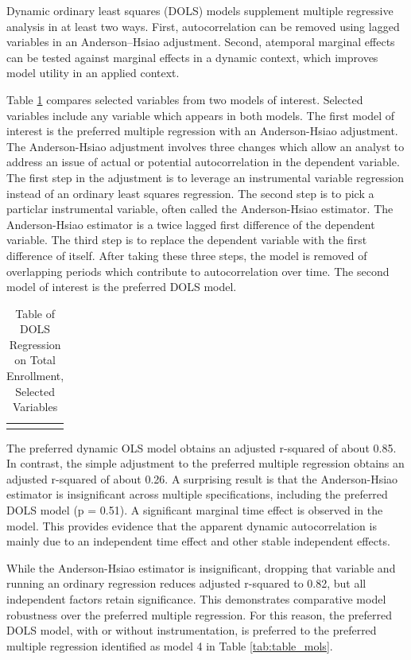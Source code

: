 \documentclass[review]{elsarticle}
\begin{document}
Dynamic ordinary least squares (DOLS) models supplement multiple regressive analysis in at least two ways.
First, autocorrelation can be removed using lagged variables in an Anderson–Hsiao adjustment\cite{anderson1981estimation}.
Second, atemporal marginal effects can be tested against marginal effects in a dynamic context,
which improves model utility in an applied context.

Table \ref{tab:table_dols} compares selected variables from two models of interest.
Selected variables include any variable which appears in both models.
The first model of interest is the preferred multiple regression with an Anderson-Hsiao adjustment.
The Anderson-Hsiao adjustment involves three changes which allow an analyst to address an issue of actual or potential autocorrelation in the dependent variable.
The first step in the adjustment is to leverage an instrumental variable regression instead of an ordinary least squares regression.
The second step is to pick a particlar instrumental variable, often called the Anderson-Hsiao estimator.
The Anderson-Hsiao estimator is a twice lagged first difference of the dependent variable.
The third step is to replace the dependent variable with the first difference of itself.
After taking these three steps, the model is removed of overlapping periods which contribute to autocorrelation over time.
The second model of interest is the preferred DOLS model.

\begin{table}
    \caption{Table of DOLS Regression on Total Enrollment, Selected Variables}
    \begin{tabularx}{\textwidth}{X}
        \centering
        
    \end{tabularx}
    \label{tab:table_dols}
\end{table}

The preferred dynamic OLS model obtains an adjusted r-squared of about 0.85.
In contrast, the simple adjustment to the preferred multiple regression
obtains an adjusted r-squared of about 0.26.
A surprising result is that the Anderson-Hsiao estimator is insignificant
across multiple specifications, including the preferred DOLS model (p = 0.51).
A significant marginal time effect is observed in the model.
This provides evidence that the apparent dynamic autocorrelation is
mainly due to an independent time effect and other stable independent effects.

While the Anderson-Hsiao estimator is insignificant,
dropping that variable and running an ordinary regression reduces adjusted r-squared to 0.82,
but all independent factors retain significance.
This demonstrates comparative model robustness over the preferred multiple regression.
For this reason, the preferred DOLS model, with or without instrumentation,
is preferred to the preferred multiple regression identified as
model 4 in Table \ref{tab:table_mols}.
\end{document}
